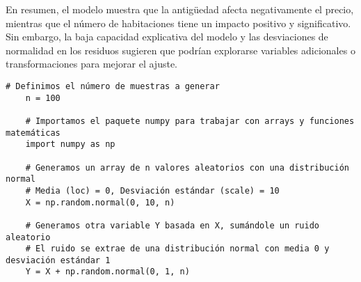 \documentclass[a4paper,12pt]{article}
\begin{document}
En resumen, el modelo muestra que la antigüedad afecta negativamente el precio, mientras que el número de habitaciones tiene un impacto positivo y significativo. Sin embargo, la baja capacidad explicativa del modelo y las desviaciones de normalidad en los residuos sugieren que podrían explorarse variables adicionales o transformaciones para mejorar el ajuste.
\newpage

\begin{lstlisting}[style=custompython, caption=Generación de datos sintéticos con numpy]
    # Definimos el número de muestras a generar
    n = 100
    
    # Importamos el paquete numpy para trabajar con arrays y funciones matemáticas
    import numpy as np
    
    # Generamos un array de n valores aleatorios con una distribución normal
    # Media (loc) = 0, Desviación estándar (scale) = 10
    X = np.random.normal(0, 10, n)
    
    # Generamos otra variable Y basada en X, sumándole un ruido aleatorio
    # El ruido se extrae de una distribución normal con media 0 y desviación estándar 1
    Y = X + np.random.normal(0, 1, n)
    \end{lstlisting}
    
\end{document}
